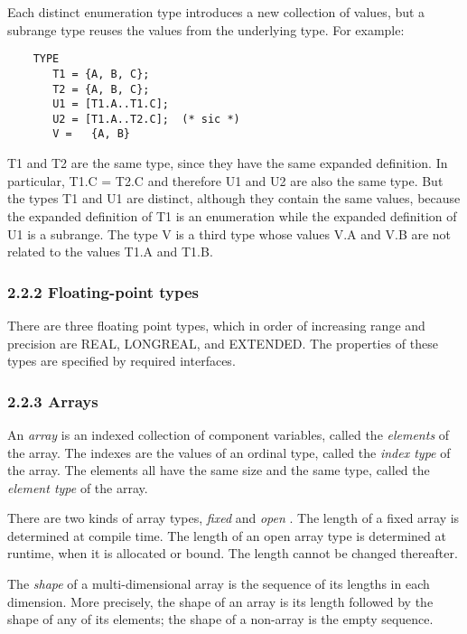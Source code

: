 \documentclass[10pt]{article}
\begin{document}
  Each distinct enumeration type introduces a new collection of values, but a subrange type reuses the values from the underlying type. For example: 
\begin{verbatim}
    TYPE
       T1 = {A, B, C}; 
       T2 = {A, B, C}; 
       U1 = [T1.A..T1.C]; 
       U2 = [T1.A..T2.C];  (* sic *) 
       V =   {A, B}
\end{verbatim}
 T1 and T2 are the same type, since they have the same expanded definition. In particular, T1.C = T2.C and therefore U1 and U2 are also the same type. But the types T1 and U1 are distinct, although they contain the same values, because the expanded definition of T1 is an enumeration while the expanded definition of U1 is a subrange. The type V is a third type whose values V.A and V.B are not related to the values T1.A and T1.B. 


 
\subsubsection*{2.2.2 Floating-point types}


  There are three floating point types, which in order of increasing range and precision are REAL, LONGREAL, and EXTENDED. The properties of these types are specified by required interfaces. 


 
\subsubsection*{2.2.3 Arrays}


  An \emph{array}
 is an indexed collection of component variables, called the \emph{elements}
 of the array. The indexes are the values of an ordinal type, called the \emph{index type}
 of the array. The elements all have the same size and the same type, called the \emph{element type}
 of the array. 


 There are two kinds of array types, \emph{fixed}
 and \emph{open}
. The length of a fixed array is determined at compile time. The length of an open array type is determined at runtime, when it is allocated or bound. The length cannot be changed thereafter. 


 The \emph{shape}
 of a multi-dimensional array is the sequence of its lengths in each dimension. More precisely, the shape of an array is its length followed by the shape of any of its elements; the shape of a non-array is the empty sequence. 
\end{document}

